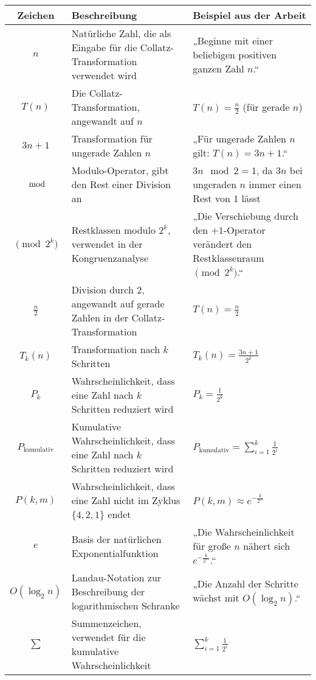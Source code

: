 \documentclass[a4paper,12pt]{article}
\begin{document}
\begin{table}[h!]
    \centering
    \begin{tabular}{|c|p{7cm}|p{5cm}|}
    \hline
    \textbf{Zeichen} & \textbf{Beschreibung} & \textbf{Beispiel aus der Arbeit} \\ \hline
    \( n \) & Natürliche Zahl, die als Eingabe für die Collatz-Transformation verwendet wird & „Beginne mit einer beliebigen positiven ganzen Zahl \( n \).“ \\ \hline
    \( T(n) \) & Die Collatz-Transformation, angewandt auf \( n \) & \( T(n) = \frac{n}{2} \) (für gerade \( n \)) \\ \hline
    \( 3n + 1 \) & Transformation für ungerade Zahlen \( n \) & „Für ungerade Zahlen \( n \) gilt: \( T(n) = 3n + 1 \).“ \\ \hline
    \( \mod \) & Modulo-Operator, gibt den Rest einer Division an & \( 3n \mod 2 = 1 \), da \( 3n \) bei ungeraden \( n \) immer einen Rest von 1 lässt \\ \hline
    \( \pmod{2^k} \) & Restklassen modulo \( 2^k \), verwendet in der Kongruenzanalyse & „Die Verschiebung durch den \(+1\)-Operator verändert den Restklassenraum \( \pmod{2^k} \).“ \\ \hline
    \( \frac{n}{2} \) & Division durch 2, angewandt auf gerade Zahlen in der Collatz-Transformation & \( T(n) = \frac{n}{2} \) \\ \hline
    \( T_k(n) \) & Transformation nach \( k \) Schritten & \( T_k(n) = \frac{3n + 1}{2^k} \) \\ \hline
    \( P_k \) & Wahrscheinlichkeit, dass eine Zahl nach \( k \) Schritten reduziert wird & \( P_k = \frac{1}{2^k} \) \\ \hline
    \( P_{\text{kumulativ}} \) & Kumulative Wahrscheinlichkeit, dass eine Zahl nach \( k \) Schritten reduziert wird & \( P_{\text{kumulativ}} = \sum_{i=1}^k \frac{1}{2^i} \) \\ \hline
    \( P(k, m) \) & Wahrscheinlichkeit, dass eine Zahl nicht im Zyklus \( \{4,2,1\} \) endet & \( P(k,m) \approx e^{-\frac{k}{2^m}} \) \\ \hline
    \( e \) & Basis der natürlichen Exponentialfunktion & „Die Wahrscheinlichkeit für große \( n \) nähert sich \( e^{-\frac{k}{2^m}} \).“ \\ \hline
    \( O(\log_2 n) \) & Landau-Notation zur Beschreibung der logarithmischen Schranke & „Die Anzahl der Schritte wächst mit \( O(\log_2 n) \).“ \\ \hline
    \( \sum \) & Summenzeichen, verwendet für die kumulative Wahrscheinlichkeit & \( \sum_{i=1}^k \frac{1}{2^i} \) \\ \hline

\end{tabular}
\end{table}
\end{document}
